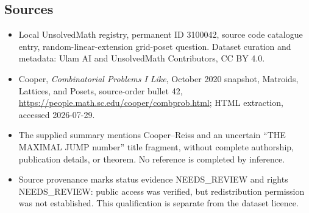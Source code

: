 \documentclass[11pt]{article}
\begin{document}
\subsection{Sources}
\begin{itemize}
\item Local UnsolvedMath registry, permanent ID 3100042, source code catalogue entry, random-linear-extension grid-poset question. Dataset curation and metadata: Ulam AI and UnsolvedMath Contributors, CC BY 4.0.
\item Cooper, \emph{Combinatorial Problems I Like}, October 2020 snapshot, Matroids, Lattices, and Posets, source-order bullet 42, \url{https://people.math.sc.edu/cooper/combprob.html}; HTML extraction, accessed 2026-07-29.
\item The supplied summary mentions Cooper--Reiss and an uncertain ``THE MAXIMAL JUMP number'' title fragment, without complete authorship, publication details, or theorem. No reference is completed by inference.
\item Source provenance marks status evidence NEEDS\_REVIEW and rights NEEDS\_REVIEW: public access was verified, but redistribution permission was not established. This qualification is separate from the dataset licence.
\end{itemize}
\end{document}
